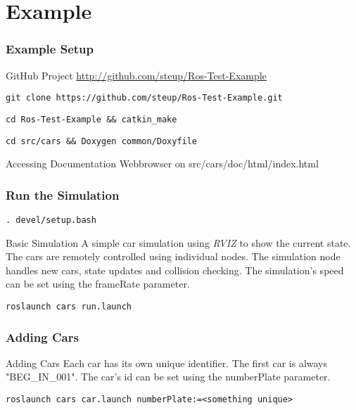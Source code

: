 \documentclass{beamer}
\begin{document}
\section{Example}
\begin{frame}[fragile]
  \frametitle{Example Setup}
  \begin{block}{GitHub Project}
    \centering
    \url{http://github.com/steup/Ros-Test-Example}
  \end{block}
  \pause
  \begin{lstlisting}[title=Download Command, style=cmd]
git clone https://github.com/steup/Ros-Test-Example.git
  \end{lstlisting}
  \pause
  \begin{lstlisting}[title=Compile Command, style=cmd]
cd Ros-Test-Example && catkin_make
  \end{lstlisting}
  \pause
  \begin{lstlisting}[title=Create Documentation, style=cmd]
cd src/cars && Doxygen common/Doxyfile
  \end{lstlisting}
  \begin{block}{Accessing Documentation}
    \centering
    Webbrowser on src/cars/doc/html/index.html
  \end{block}
\end{frame}

\begin{frame}[fragile]
  \frametitle{Run the Simulation}

  \begin{lstlisting}[title=Setup Workspace, style=cmd]
. devel/setup.bash
  \end{lstlisting}

  \pause

  \begin{block}{Basic Simulation}
    A simple car simulation using \emph{RVIZ} to show the current state. The cars are remotely controlled using individual nodes. The simulation node handles new cars, state updates and collision checking. The simulation's speed can be set using the {\ttfamily frameRate} parameter.
  \end{block}

  \begin{lstlisting}[title=Run Simulation, style=cmd]
roslaunch cars run.launch
  \end{lstlisting}
\end{frame}

\begin{frame}[fragile]
  \frametitle{Adding Cars}

  \begin{block}{Adding Cars}
    Each car has its own unique identifier. The first car is always {\ttfamily"BEG\_IN\_001"}. The car's id can be set using the {\ttfamily numberPlate} parameter.
  \end{block}

  \begin{lstlisting}[title=Add Car, style=cmd]
roslaunch cars car.launch numberPlate:=<something unique>
  \end{lstlisting}
\end{frame}
\end{document}
